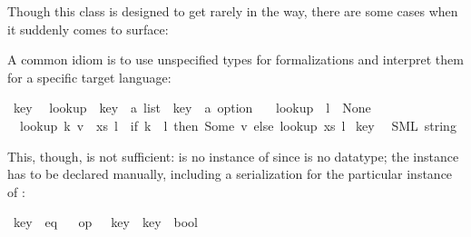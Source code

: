\begin{isabellebody}
\begin{isamarkuptext}
  Though this class is designed to get rarely in the way, there
  are some cases when it suddenly comes to surface:%
\end{isamarkuptext}%
\isamarkuptrue%
%
\isamarkuptrue%
%
\begin{isamarkuptext}%
A common idiom is to use unspecified types for formalizations
  and interpret them for a specific target language:%
\end{isamarkuptext}%
\isamarkuptrue%
\isamarkupfalse%
\ key\isanewline
\isanewline
{}\isamarkupfalse%
\isanewline
\ \ lookup\ {\isacharcolon}{\isacharcolon}\ {\isachardoublequoteopen}{\isacharparenleft}key\ {\isasymtimes}\ {\isacharprime}a{\isacharparenright}\ list\ {\isasymRightarrow}\ key\ {\isasymRightarrow}\ {\isacharprime}a\ option{\isachardoublequoteclose}\ \isanewline
\ \ {\isachardoublequoteopen}lookup\ {\isacharbrackleft}{\isacharbrackright}\ l\ {\isacharequal}\ None{\isachardoublequoteclose}\isanewline
\ \ {\isachardoublequoteopen}lookup\ {\isacharparenleft}{\isacharparenleft}k{\isacharcomma}\ v{\isacharparenright}\ {\isacharhash}\ xs{\isacharparenright}\ l\ {\isacharequal}\ {\isacharparenleft}if\ k\ {\isacharequal}\ l\ then\ Some\ v\ else\ lookup\ xs\ l{\isacharparenright}{\isachardoublequoteclose}\isanewline
%
\isadelimtt
%
\endisadelimtt
%
\isatagtt
{}\isamarkupfalse%
\ key\isanewline
\ \ {\isacharparenleft}SML\ {\isachardoublequoteopen}string{\isachardoublequoteclose}{\isacharparenright}%
\endisatagtt
{\isafoldtt}%
%
\isadelimtt
%
\endisadelimtt
%
\begin{isamarkuptext}%
This, though, is not sufficient:  is no instance
  of  since  is no datatype; the instance
  has to be declared manually, including a serialization
  for the particular instance of :%
\end{isamarkuptext}%
\isamarkuptrue%
\isamarkupfalse%
\ key\ {\isacharcolon}{\isacharcolon}\ eq%
\isadelimproof
\ %
\endisadelimproof
%
\isatagproof
\isacommand{{\isachardot}{\isachardot}}\isamarkupfalse%
%
\endisatagproof
{\isafoldproof}%
%
\isadelimproof
%
\endisadelimproof
\isanewline
%
\isadelimtt
\isanewline
%
\endisadelimtt
%
\isatagtt
{}\isamarkupfalse%
\ {\isachardoublequoteopen}op\ {\isacharequal}\ {\isasymColon}\ key\ {\isasymRightarrow}\ key\ {\isasymRightarrow}\ bool{\isachardoublequoteclose}\isanewline

\end{isabellebody}
